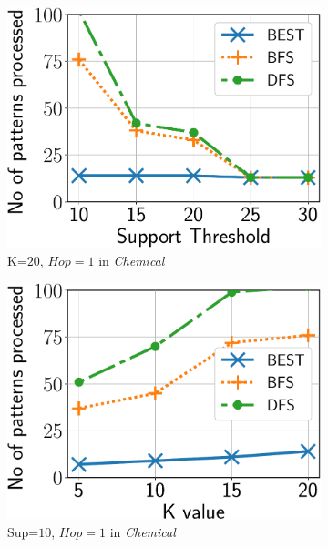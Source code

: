 \begin{figure}
	\begin{subfigure}[t]{0.25\textwidth}
		\includegraphics[keepaspectratio,scale=0.24, angle=0]{img2/chemical/chemical_bfsdfs_pop.pdf}
		\caption{\scriptsize {\sf K}=$20$, $Hop=1$ in {\em Chemical}}
		\label{fig:chemical_bfsdfs_pop}
	\end{subfigure}%
	\begin{subfigure}[t]{0.25\textwidth}
		\includegraphics[keepaspectratio,scale=0.24, angle=0]{img2/chemical/chemical_bfsdfs_pop_k.pdf}
		\caption{\scriptsize{\sf Sup}=$10$, $Hop=1$ in {\em Chemical}}
		\label{fig:chemical_bfsdfs_pop_k}
	\end{subfigure}
	\begin{subfigure}[t]{0.25\textwidth}

\end{subfigure}
\end{figure}
